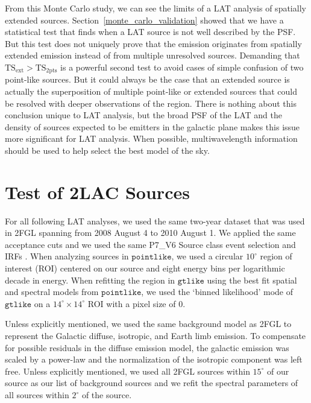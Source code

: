 \documentclass[12pt,preprint]{aastex}
\newcommand{\gev}{\text{GeV}\xspace}
\newcommand{\tsext}{{\ensuremath{\text{TS}_{\text{ext}}}}\xspace}
\newcommand{\tsinc}{\ensuremath{\text{TS}_{\text{2pts}}}\xspace}
\newcommand{\gtlike}{\ensuremath{\mathtt{gtlike}}\xspace}
\newcommand{\pointlike}{\ensuremath{\mathtt{pointlike}}\xspace}
\newcommand{\degree}{^\circ\xspace}
\begin{document}
From this Monte Carlo study, we can see the limits of a LAT analysis
of spatially extended sources.  Section~\ref{monte_carlo_validation}
showed that we have a statistical test that finds when a LAT source is
not well described by the PSF.  But this test does not uniquely prove
that the emission originates from spatially extended emission instead
of from multiple unresolved sources.  Demanding that $\tsext>\tsinc$
is a powerful second test to avoid cases of simple confusion of two
point-like sources. But it could always be the case that an extended
source is actually the superposition of multiple point-like or
extended sources that could be resolved with deeper observations of the
region.  There is nothing about this conclusion unique to LAT analysis,
but the broad PSF of the LAT and the density of sources expected to be
\gev emitters in the galactic plane makes this issue more significant
for LAT analysis.  When possible, multiwavelength information should be
used to help select the best model of the sky.


\section{Test of 2LAC Sources}
\label{test_2lac_sources}


For all following LAT analyses, we used the same two-year dataset
that was used in 2FGL spanning from 2008 August 4 to 2010 August 1. We
applied the same acceptance cuts and we used the same P7\_V6 Source class
event selection and IRFs \citep{lat_on_orbit_psf}.  
When analyzing sources in \pointlike, we used a circular $10\degree$ region of
interest (ROI) centered on our source and eight energy bins per
logarithmic decade in energy.
When refitting the region in \gtlike using the best fit spatial and
spectral models from \pointlike, we used the `binned likelihood' mode of
\gtlike on a $14\degree\times14\degree$ ROI with a pixel size of 0.

Unless explicitly
mentioned, we used the same background model as 2FGL to represent the
Galactic diffuse, isotropic, and Earth limb emission.  To compensate for
possible residuals in the diffuse emission model, the galactic emission
was scaled by a power-law and the normalization
of the isotropic component
was left free.  
Unless explicitly mentioned,
we used all 2FGL sources within $15\degree$ of our source as our list
of background sources and we refit the spectral parameters of all sources
within $2\degree$ of the source.
\end{document}
